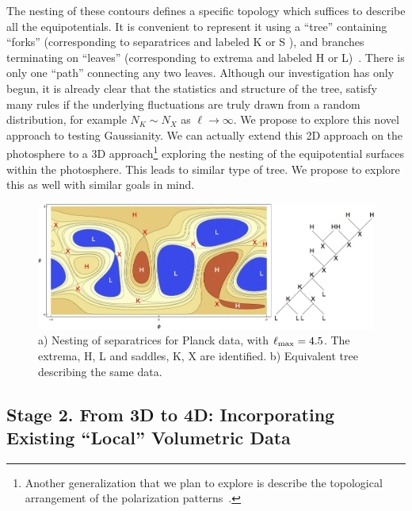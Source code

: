 \documentclass[psfig,12pt]{article}
\begin{document}
{The nesting of these contours defines a specific topology which suffices
to describe all the equipotentials. It is convenient to represent it
using a ``tree'' containing ``forks'' (corresponding to separatrices and
labeled K or S ), and branches terminating on ``leaves'' (corresponding
to extrema and labeled H or L)~\cite{west2001introduction}. There is
only one ``path'' connecting any two leaves. Although our investigation
has only begun, it is already clear that the statistics and structure of
the tree, satisfy many rules if the underlying fluctuations are truly
drawn from a random distribution, for example $N_K\sim N_X$ as
$\ell\rightarrow\infty$. We propose to explore this novel approach to
testing Gaussianity. We can actually extend this 2D approach on the
photosphere to a 3D approach\footnote{Another generalization that we
plan to explore is describe the topological arrangement of the
polarization patterns~\cite{Scheuer:1977}.} exploring the nesting of the
equipotential surfaces within the photosphere. This leads to similar
type of tree. We propose to explore this as well with similar goals in
mind.
\begin{figure}[t]
\centering\includegraphics[width=0.9\linewidth]{figures/nsffig5.jpg}
\caption{{\small a) Nesting of separatrices for Planck data, with
$\ell_{\rm max}=4.5$. The extrema, H, L and saddles, K, X are
identified. b) Equivalent tree describing the same data.}}
\end{figure}



\subsection{Stage 2. From 3D to 4D: Incorporating Existing ``Local'' Volumetric Data}

}
\end{document}
